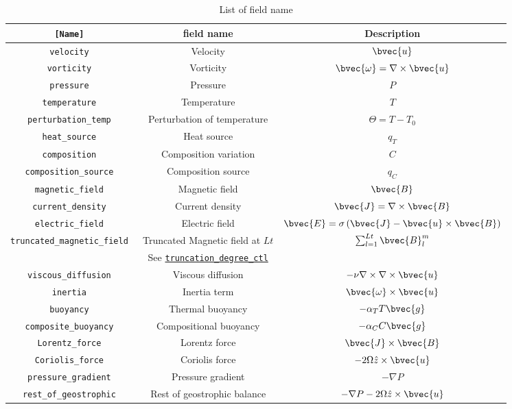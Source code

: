 \begin{table}[htp]
\caption{List of field name}
\begin{center}
\begin{tabular}{|c|c|c|}
\hline
\tt [Name] & field name & Description \\ \hline \hline
\tt velocity &    Velocity &  $\bvec{u}$ \\
\tt vorticity &   Vorticity & $\bvec{\omega} = \nabla \times \bvec{u} $ \\
\tt pressure &    Pressure & $P$ \\
\hline
\tt temperature & Temperature & $T$ \\
\tt perturbation\_temp & Perturbation of temperature
& $\Theta = T - T_{0}$ \\
\tt heat\_source & Heat source
& $q_{T}$ \\
\hline
\tt composition & Composition variation & $C$ \\
\tt composition\_source & Composition source & $q_{C}$ \\
\hline
\tt magnetic\_field &  Magnetic field  & $\bvec{B}$ \\
\tt current\_density & Current density & $\bvec{J} = \nabla \times \bvec{B} $ \\
\tt electric\_field & Electric field & $\bvec{E} = \sigma \left(\bvec{J} - \bvec{u} \times \bvec{B}\right) $ \\
\tt truncated\_magnetic\_field & Truncated Magnetic field at $Lt$ & $\sum_{l=1}^{Lt} \bvec{B}_{l}^{m}$ \\
 &  See \hyperref[href_t:crustal_filtering_ctl]{\tt truncation\_degree\_ctl} &  \\
\hline \hline
\tt viscous\_diffusion & Viscous diffusion
& $-\nu \nabla \times \nabla \times \bvec{u}$ \\
\tt inertia & Inertia term &  $ \bvec{\omega} \times \bvec{u} $ \\
\tt buoyancy                   & Thermal buoyancy &  $ -\alpha_{T} T \bvec{g}  $ \\
\tt composite\_buoyancy & Compositional buoyancy &  $ -\alpha_{C} C\bvec{g}  $\\
\tt Lorentz\_force & Lorentz force &  $ \bvec{J} \times \bvec{B} $ \\
\tt Coriolis\_force & Coriolis force &  $ -2 \Omega \hat{z} \times \bvec{u} $ \\
\tt pressure\_gradient & Pressure gradient &  $  - \nabla P  $ \\
\tt rest\_of\_geostrophic & Rest of geostrophic balance &  $ - \nabla P - 2 \Omega \hat{z} \times \bvec{u} $ \\

\end{tabular}
\end{center}
\end{table}
